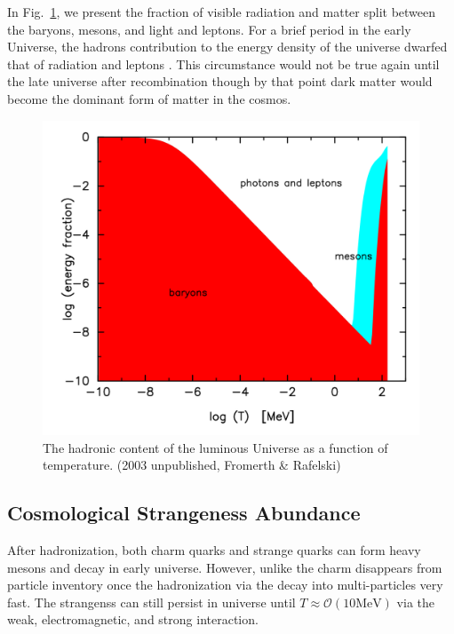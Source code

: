 \documentclass[universe,article,submit,moreauthors,pdftex,a4paper]{Definitions/mdpi}
\newcommand*{\rf}[1]{Fig.~{\ref{#1}}}
\begin{document}
In \rf{hadron_content}, we present the fraction of visible radiation and matter split between the baryons, mesons, and light and leptons. For a brief period in the early Universe, the hadrons contribution to the energy density of the universe dwarfed that of radiation and leptons \cite{Rafelski:2019twp}. This circumstance would not be true again until the late universe after recombination though by that point dark matter would become the dominant form of matter in the cosmos.
\begin{figure}[H]
\centering
\includegraphics[width=\linewidth]{hadron_content.png}
\caption{The hadronic content of the luminous Universe as a function of temperature. (2003 unpublished, Fromerth \& Rafelski) \cite{Rafelski:2019twp}}
\label{hadron_content}
\end{figure}




\subsection{Cosmological Strangeness Abundance}\label{sec:Strangeness}
\noindent 
After hadronization, both charm quarks and strange quarks can form heavy mesons and decay in early universe. However, unlike the charm disappears from particle inventory once the hadronization via the decay into multi-particles very fast. The strangenss can still persist in universe until $T\approx\mathcal{O}(10\mathrm{MeV})$ via the weak, electromagnetic, and strong interaction\cite{Yang:2021bko}.
\end{document}
